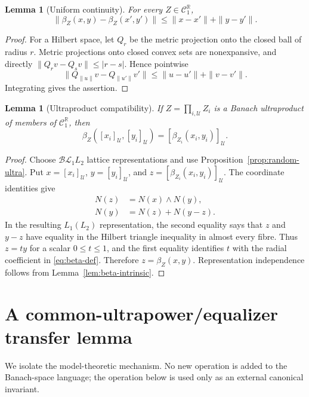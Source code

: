 \documentclass[11pt]{article}
\newcommand{\BL}{\mathcal{BL}}
\newcommand{\C}{\mathcal C}
\newcommand{\U}{\mathcal U}
\newcommand{\R}{\mathbb R}
\newcommand{\1}{\mathbf 1}
\newtheorem{lemma}[theorem]{Lemma}
\theoremstyle{definition}
\theoremstyle{remark}
\begin{document}
\begin{lemma}[Uniform continuity]
\label{lem:beta-Lipschitz}
For every $Z\in\C_1^{\R}$,
\[
 \|\beta_Z(x,y)-\beta_Z(x',y')\|
       \leq \|x-x'\|+\|y-y'\|.
\]
\end{lemma}

\begin{proof}
For a Hilbert space, let $Q_r$ be the metric projection onto the closed ball
of radius $r$.  Metric projections onto closed convex sets are
nonexpansive, and directly
$\|Q_rv-Q_sv\|\leq|r-s|$.  Hence pointwise
\[
 \|Q_{\|u\|}v-Q_{\|u'\|}v'\|
 \leq \|u-u'\|+\|v-v'\|.
\]
Integrating gives the assertion.
\end{proof}

\begin{lemma}[Ultraproduct compatibility]
\label{lem:beta-ultra}
If $Z=\prod_{i,\U}Z_i$ is a Banach ultraproduct of members of
$\C_1^{\R}$, then
\[
 \beta_Z([x_i]_{\U},[y_i]_{\U})
       =[\beta_{Z_i}(x_i,y_i)]_{\U}.
\]
\end{lemma}

\begin{proof}
Choose $\BL_1L_2$ lattice representations and use
Proposition~\ref{prop:random-ultra}.  Put
$x=[x_i]_{\U}$, $y=[y_i]_{\U}$, and
$z=[\beta_{Z_i}(x_i,y_i)]_{\U}$.  The coordinate identities give
\begin{align*}
 N(z)&=N(x)\wedge N(y),\\
 N(y)&=N(z)+N(y-z).
\end{align*}
In the resulting $L_1(L_2)$ representation, the second equality says that
$z$ and $y-z$ have equality in the Hilbert triangle inequality in almost
every fibre.  Thus $z=t y$ for a scalar $0\leq t\leq1$, and the first
equality identifies $t$ with the radial coefficient in
\eqref{eq:beta-def}.  Therefore $z=\beta_Z(x,y)$.  Representation
independence follows from Lemma~\ref{lem:beta-intrinsic}.
\end{proof}

\section{A common-ultrapower/equalizer transfer lemma}

We isolate the model-theoretic mechanism.  No new operation is added to the
Banach-space language; the operation below is used only as an external
canonical invariant.
\end{document}
